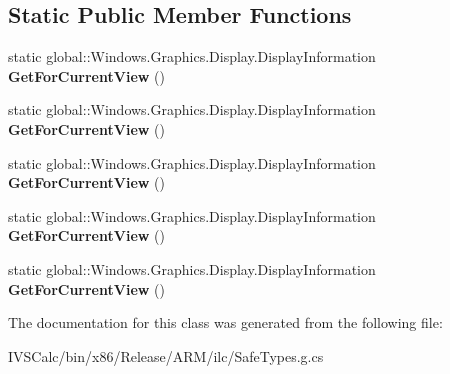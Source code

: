 \subsection*{Static Public Member Functions}
\begin{DoxyCompactItemize}
\item 
\mbox{\label{class_windows_1_1_graphics_1_1_display_1_1_display_information_a6a22d3da503e17f1af480aaafcc8713a}} 
static global\+::\+Windows.\+Graphics.\+Display.\+Display\+Information {\bfseries Get\+For\+Current\+View} ()
\item 
\mbox{\label{class_windows_1_1_graphics_1_1_display_1_1_display_information_a6a22d3da503e17f1af480aaafcc8713a}} 
static global\+::\+Windows.\+Graphics.\+Display.\+Display\+Information {\bfseries Get\+For\+Current\+View} ()
\item 
\mbox{\label{class_windows_1_1_graphics_1_1_display_1_1_display_information_a6a22d3da503e17f1af480aaafcc8713a}} 
static global\+::\+Windows.\+Graphics.\+Display.\+Display\+Information {\bfseries Get\+For\+Current\+View} ()
\item 
\mbox{\label{class_windows_1_1_graphics_1_1_display_1_1_display_information_a6a22d3da503e17f1af480aaafcc8713a}} 
static global\+::\+Windows.\+Graphics.\+Display.\+Display\+Information {\bfseries Get\+For\+Current\+View} ()
\item 
\mbox{\label{class_windows_1_1_graphics_1_1_display_1_1_display_information_a6a22d3da503e17f1af480aaafcc8713a}} 
static global\+::\+Windows.\+Graphics.\+Display.\+Display\+Information {\bfseries Get\+For\+Current\+View} ()
\end{DoxyCompactItemize}


The documentation for this class was generated from the following file\+:\begin{DoxyCompactItemize}
\item 
I\+V\+S\+Calc/bin/x86/\+Release/\+A\+R\+M/ilc/Safe\+Types.\+g.\+cs\end{DoxyCompactItemize}
